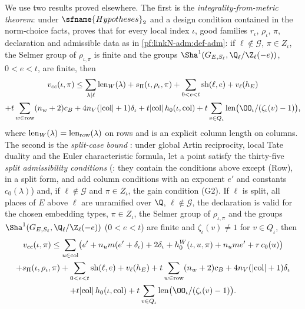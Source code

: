 We use two results proved elsewhere. The first is the \emph{integrality-from-metric theorem}: under
$\sfname{Hypotheses}_2$ and a design condition contained in the norm-choice facts,
 proves that for every local index $\iota$, good
families $r_\iota$, $\rho_\iota$, $\pi$, declaration and admissible data as in \cref{pf:linkN-adm:def-adm}: if
$\ell\notin\mathcal G$, $\pi\in Z_\iota$, the Selmer group of $\rho_{\iota,\pi}$ is finite and the groups
$\Sha^1(G_{E,S_\ell},\Q_\ell/\Z_\ell(-e))$, $0<e<t$, are finite, then
\begin{multline}\label{pf:linkN-adm:eq-ifm}
\linkNadmvcc(\iota,\pi)\le\sum_{\lambda\mid\ell}\linkNadmlen_W(\lambda)+\linkNadmsP(\iota,\rho_\iota,\pi)
+\sum_{0<e<t}\mathrm{sh}(\ell,e)+v_\ell(h_E)\\
+t\sum_{w\in\mathrm{row}}(n_w+2)c_B+4n_V(|\mathrm{col}|+1)\delta_\iota+t|\mathrm{col}|\,h_0(\iota,\mathrm{col})
+t\sum_{v\in Q_\iota}\linkNadmlen\bigl(\OO_\iota/(\zeta_\iota(v)-1)\bigr),
\end{multline}
where $\operatorname{len}_W(\lambda)=\operatorname{len}_{\mathrm{row}}(\lambda)$ on rows and is an explicit column length on columns.
The second is the \emph{split-case bound} :
under global Artin reciprocity, local Tate duality and the Euler characteristic formula, let a point satisfy the
thirty-five \emph{split admissibility conditions} (: they contain
the conditions above except (Row), in a split form, and add column conditions with an exponent $e'$ and constants
$c_0(\lambda)$) and, if $\ell\notin\mathcal G$ and $\pi\in Z_\iota$, the gain condition (G2). If $\ell$ is split,
all places of $E$ above $\ell$ are unramified over $\Q$, $\ell\notin\mathcal G$, the declaration is valid for the chosen
embedding types, $\pi\in Z_\iota$, the Selmer group of $\rho_{\iota,\pi}$ and the groups $\Sha^1(G_{E,S_\ell},\Q_\ell/\Z_\ell(-e))$
($0<e<t$) are finite and $\zeta_\iota(v)\ne1$ for $v\in Q_\iota$, then
\begin{multline}\label{pf:linkN-adm:eq-split}
\linkNadmvcc(\iota,\pi)\le\sum_{u\in\mathrm{col}}\bigl(e'+n_um(e'+\delta_\iota)+2\delta_\iota+h^W_0(\iota,u,\pi)
+n_ume'+r\,c_0(u)\bigr)\\
+\linkNadmsP(\iota,\rho_\iota,\pi)+\sum_{0<e<t}\mathrm{sh}(\ell,e)+v_\ell(h_E)
+t\sum_{w\in\mathrm{row}}(n_w+2)c_B+4n_V(|\mathrm{col}|+1)\delta_\iota\\
+t|\mathrm{col}|\,h_0(\iota,\mathrm{col})+t\sum_{v\in Q_\iota}\linkNadmlen\bigl(\OO_\iota/(\zeta_\iota(v)-1)\bigr).
\end{multline}

